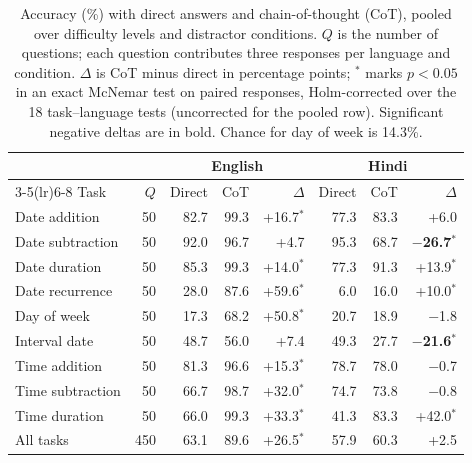 \begin{table}[t]
\centering
\begin{tabular}{lrrrrrrr}
\toprule
 & & \multicolumn{3}{c}{English} & \multicolumn{3}{c}{Hindi} \\
\cmidrule(lr){3-5}\cmidrule(lr){6-8}
Task & $Q$ & Direct & CoT & $\Delta$ & Direct & CoT & $\Delta$ \\
\midrule
Date addition & 50 & 82.7 & 99.3 & +16.7$^{*}$ & 77.3 & 83.3 & +6.0\phantom{$^{*}$} \\
Date subtraction & 50 & 92.0 & 96.7 & +4.7\phantom{$^{*}$} & 95.3 & 68.7 & \textbf{$-$26.7$^{*}$} \\
Date duration & 50 & 85.3 & 99.3 & +14.0$^{*}$ & 77.3 & 91.3 & +13.9$^{*}$ \\
Date recurrence & 50 & 28.0 & 87.6 & +59.6$^{*}$ & 6.0 & 16.0 & +10.0$^{*}$ \\
Day of week & 50 & 17.3 & 68.2 & +50.8$^{*}$ & 20.7 & 18.9 & $-$1.8\phantom{$^{*}$} \\
Interval date & 50 & 48.7 & 56.0 & +7.4\phantom{$^{*}$} & 49.3 & 27.7 & \textbf{$-$21.6$^{*}$} \\
Time addition & 50 & 81.3 & 96.6 & +15.3$^{*}$ & 78.7 & 78.0 & $-$0.7\phantom{$^{*}$} \\
Time subtraction & 50 & 66.7 & 98.7 & +32.0$^{*}$ & 74.7 & 73.8 & $-$0.8\phantom{$^{*}$} \\
Time duration & 50 & 66.0 & 99.3 & +33.3$^{*}$ & 41.3 & 83.3 & +42.0$^{*}$ \\
\midrule
All tasks & 450 & 63.1 & 89.6 & +26.5$^{*}$ & 57.9 & 60.3 & +2.5\phantom{$^{*}$} \\
\bottomrule
\end{tabular}
\caption{Accuracy (\%) with direct answers and chain-of-thought (CoT), pooled over difficulty levels and distractor conditions. $Q$ is the number of questions; each question contributes three responses per language and condition. $\Delta$ is CoT minus direct in percentage points; $^{*}$ marks $p<0.05$ in an exact McNemar test on paired responses, Holm-corrected over the 18 task--language tests (uncorrected for the pooled row). Significant negative deltas are in bold. Chance for day of week is 14.3\%.}
\label{tab:cot-delta}
\end{table}
